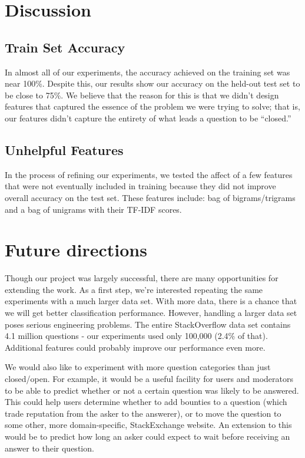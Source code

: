 \documentclass[11pt]{article}
\begin{document}
\section{Discussion}

\subsection{Train Set Accuracy}
In almost all of our experiments, the accuracy achieved on the
training set was near 100\%.  Despite this, our results show our
accuracy on the held-out test set to be close to 75\%.  We believe
that the reason for this is that we didn't design features that
captured the essence of the problem we were trying to solve; that is,
our features didn't capture the entirety of what leads a question to
be ``closed.''

\subsection{Unhelpful Features}
In the process of refining our experiments, we tested the affect of a
few features that were not eventually included in training because
they did not improve overall accuracy on the test set. These features
include: bag of bigrams/trigrams and a bag of unigrams with their
TF-IDF scores.

\section{Future directions}
Though our project was largely successful, there are many
opportunities for extending the work.  As a first step, we're
interested repeating the same experiments with a much larger data
set. With more data, there is a chance that we will get better
classification performance. However, handling a larger data set poses
serious engineering problems.  The entire
StackOverflow data set contains 4.1 million questions - our experiments used only 100,000 (2.4\% of that).
Additional features could probably improve our performance even more.

We would also like to experiment with more question categories than just closed/open. For example, it would be a useful facility for users and moderators to be able to predict whether or not a certain question was likely to be answered. This could help users determine whether to add bounties to a question (which trade reputation from the asker to the answerer), or to move the question to some other, more domain-specific, StackExchange website. An extension to this would be to predict how long an asker could expect to wait before receiving an answer to their question.
\end{document}
